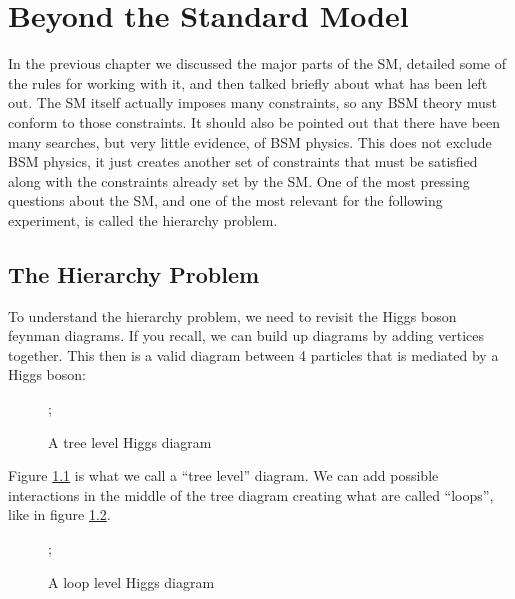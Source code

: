 \chapter{Beyond the Standard Model}
\label{chap:two}
In the previous chapter we discussed the major parts of the SM, detailed some of the rules for working with it, and then talked briefly about what has been left out.
The SM itself actually imposes many constraints, so any BSM theory must conform to those constraints. It should also be pointed out that there have been many searches, but very little evidence, of BSM physics.
This does not exclude BSM physics, it just creates another set of constraints that must be satisfied along with the constraints already set by the SM. One of the most pressing questions about the SM, and one of the most relevant for the following experiment, is called the hierarchy problem.

\section{The Hierarchy Problem}

To understand the hierarchy problem, we need to revisit the Higgs boson feynman diagrams. If you recall, we can build up diagrams by adding vertices together. This then is a valid diagram between 4 particles that is mediated by a Higgs boson:
\begin{figure} %
    \centering
       ;
    \caption{A tree level Higgs diagram}
    \label{fig:fig_2-1}
 \end{figure}

Figure \ref{fig:fig_2-1} is what we call a ``tree level'' diagram. We can add possible interactions in the middle of the tree diagram creating what are called ``loops'', like in figure \ref{fig:fig_2-2}.

\begin{figure} %
    \centering
       ;
    \caption{A loop level Higgs diagram}
    \label{fig:fig_2-2}
 \end{figure}

